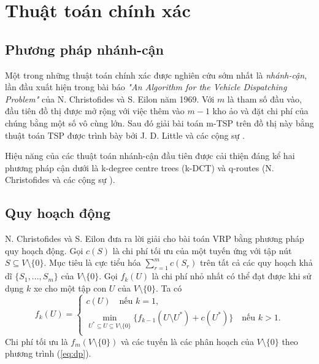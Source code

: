 \section{Thuật toán chính xác}

\subsection{Phương pháp nhánh-cận}

Một trong những thuật toán chính xác được nghiên cứu sớm nhất là \textit{nhánh-cận}, lần đầu xuất hiện trong bài báo \textit{"An Algorithm for the Vehicle Dispatching Problem"} của N. Christofides và S. Eilon \cite{christofides1969algorithm} năm 1969. Với $m$ là tham số đầu vào, đầu tiên đồ thị được mở rộng với việc thêm vào $m-1$ kho ảo và đặt chi phí của chúng bằng một số vô cùng lớn. Sau đó giải bài toán m-TSP trên đồ thị này bằng thuật toán TSP được trình bày bởi J. D. Little và các cộng sự \cite{little1963algorithm}.

Hiệu năng của các thuật toán nhánh-cận đầu tiên được cải thiện đáng kể hai phương pháp cận dưới là k-degree centre trees (k-DCT) và q-routes (N. Christofides và các cộng sự \cite{christofides1981exact}).

\subsection{Quy hoạch động}

N. Christofides và S. Eilon \cite{christofides1969algorithm} đưa ra lời giải cho bài toán VRP bằng phương pháp quy hoạch động. Gọi $c(S)$ là chi phí tối ưu của một tuyến ứng với tập nút $S \subseteq V \setminus \{0\}$. Mục tiêu là cực tiểu hóa $\sum_{r=1}^{m} c(S_r)$ trên tất cả các quy hoạch khả dĩ $\{S_1,...,S_m\}$ của $V \setminus \{0\}$. Gọi $f_k(U)$ là chi phí nhỏ nhất có thể đạt được khi sử dụng $k$ xe cho một tập con $U$ của $V \setminus \{0\}$. Ta có
\begin{equation}
	\label{eq:dp}
	f_k(U) =
	\begin{cases}
		c(U) \quad \text{nếu } k = 1,                                                                                      \\
		\min_{U^* \subseteq U \subseteq V \setminus \{0\}} \{f_{k-1} (U \setminus U^*) + c(U^*)\} \quad \text{nếu } k > 1. \\
	\end{cases}
\end{equation}
Chi phí tối ưu là $f_m(V \setminus \{0\})$ và các tuyến là các phân hoạch của $V \setminus \{0\}$ theo phương trình (\ref{eq:dp}).

